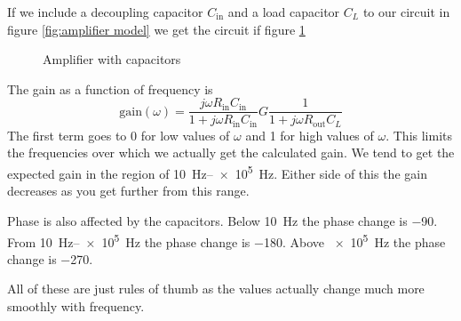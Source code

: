 \documentclass{article}
\begin{document}
    If we include a decoupling capacitor \(C_\text{in}\) and a load capacitor \(C_L\) to our circuit in figure \ref{fig:amplifier model} we get the circuit if figure \ref{fig:amplifier model with capacitors}
    \begin{figure}[ht]
        \centering
        \caption{Amplifier with capacitors}
        \label{fig:amplifier model with capacitors}
    \end{figure}
    The gain as a function of frequency is
    \[\text{gain}(\omega) = \frac{j\omega R_\text{in}C_\text{in}}{1 + j\omega R_\text{in}C_\text{in}}G\frac{1}{1 + j\omega R_\text{out}C_L}\]
    The first term goes to 0 for low values of \(\omega\) and 1 for high values of \(\omega\).
    This limits the frequencies over which we actually get the calculated gain.
    We tend to get the expected gain in the region of \SIrange{10}{e5}{Hz}. Either side of this the gain decreases as you get further from this range.
    
    Phase is also affected by the capacitors.
    Below \SI{10}{Hz} the phase change is \SI{-90}{\SIUnitSymbolDegree}.
    From \SIrange{10}{e5}{Hz} the phase change is \SI{-180}{\SIUnitSymbolDegree}.
    Above \SI{e5}{Hz} the phase change is \SI{-270}{\SIUnitSymbolDegree}.
    
    All of these are just rules of thumb as the values actually change much more smoothly with frequency.
    
\end{document}

